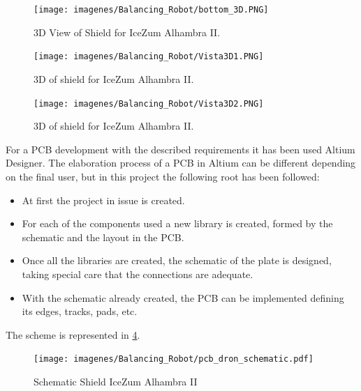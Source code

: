 	\begin{center}
		\begin{figure}[H]
			\center
			\texttt{[image: imagenes/Balancing\_Robot/bottom\_3D.PNG]}
			\caption{3D View of Shield for IceZum Alhambra II.}
			\label{fig:bottom_3D}
		\end{figure}
	\end{center}
	
	\begin{center}
		\begin{figure}[H]
			\center
			\texttt{[image: imagenes/Balancing\_Robot/Vista3D1.PNG]}
			\caption{3D of shield for IceZum Alhambra II.}
			\label{fig:Vista3D1}
		\end{figure}
	\end{center}
	
	\begin{center}
		\begin{figure}[H]
			\center
			\texttt{[image: imagenes/Balancing\_Robot/Vista3D2.PNG]}
			\caption{3D of shield for IceZum Alhambra II.}
			\label{fig:Vista3D2}
		\end{figure}
	\end{center}


For a PCB development with the described requirements it has been used Altium Designer. The elaboration process of a PCB in Altium can be different depending on the final user, but in this project the following root has been followed:

\begin{itemize}
	\item At first the project in issue is created.
	\item For each of the components used a new library is created, formed by the schematic and the layout in the PCB.
	\item Once all the libraries are created, the schematic of the plate is designed, taking special care that the connections are adequate.
	\item With the schematic already created, the PCB can be implemented defining its edges, tracks, pads, etc.
\end{itemize}

The scheme is represented in \ref{fig:schematics_tfg}.
\newpage

\begin{center}
	\begin{figure}[H]
		\center
		\texttt{[image: imagenes/Balancing\_Robot/pcb\_dron\_schematic.pdf]}
		\caption{Schematic Shield IceZum Alhambra II}
		\label{fig:schematics_tfg}
	\end{figure}
\end{center}
\newpage

